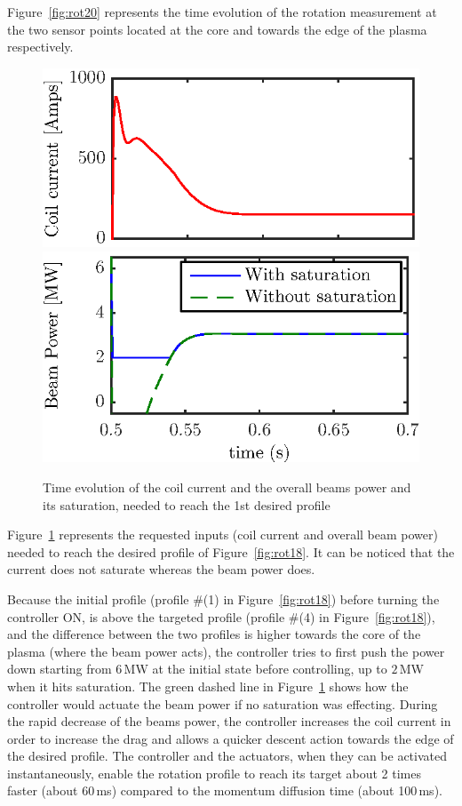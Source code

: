 \documentclass[12pt]{iopart}
\begin{document}
Figure~\ref{fig:rot20} represents the time evolution of the rotation measurement at the two sensor points located at the core and towards the edge of the plasma respectively.  



\begin{figure}
	\centering
	\includegraphics{imene_figs/fig16a}  %
	\includegraphics{imene_figs/fig16b} 
	\caption{Time evolution of the coil current and the overall beams power and its saturation, needed to reach the 1st desired profile }
	\label{fig:rot19}
\end{figure} 

Figure~\ref{fig:rot19} represents the requested inputs (coil current and overall beam power) needed to reach the desired profile of Figure~\ref{fig:rot18}. It can be noticed that the current does not saturate whereas the beam power does.

Because the initial profile (profile \#(1) in Figure~\ref{fig:rot18}) before turning the controller ON, is above the targeted profile  (profile \#(4) in Figure~\ref{fig:rot18}), and the difference between the two profiles is higher towards the core of the plasma (where the beam power acts), the controller tries to first push the power down starting from $6$\,MW at the initial state before controlling, up to $2$\,MW when it hits saturation. The green dashed line in Figure~\ref{fig:rot19} shows how the controller would actuate the beam power if no saturation was effecting. During the rapid decrease of the beams power, the controller increases the coil current in order to increase the drag and allows a quicker descent action towards the edge of the desired profile.  
The controller and the actuators, when they can be activated instantaneously, enable the rotation profile to reach its target about 2 times faster (about 60\,ms) compared to the momentum diffusion time (about 100\,ms).
\end{document}
